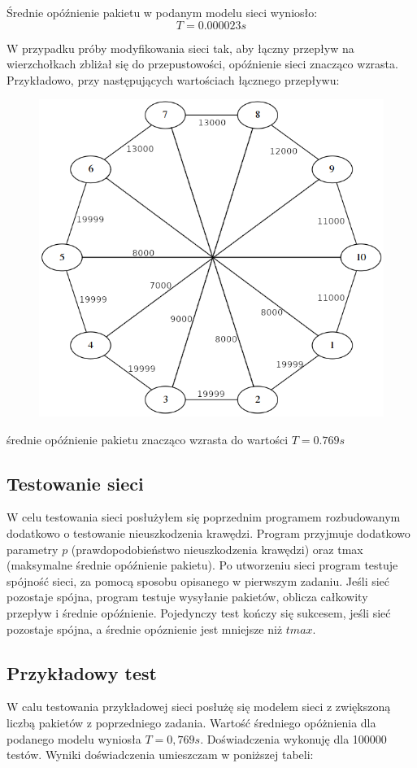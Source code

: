 \documentclass[titlepage]{article}
\begin{document}
Średnie opóźnienie pakietu w podanym modelu sieci wyniosło:
\begin{equation*}
	T = 0.000023 s
\end{equation*}

\newpage
W przypadku próby modyfikowania sieci tak, aby łączny przepływ na wierzchołkach zbliżał się do przepustowości, opóźnienie sieci znacząco wzrasta. Przykładowo, przy następujących wartościach łącznego przepływu:

\begin{figure}[h!]
	\centering
	\includegraphics[width=0.8\linewidth]{graph7.png}
\end{figure}

średnie opóźnienie pakietu znacząco wzrasta do wartości $T = 0.769 s$

\subsection{Testowanie sieci}
W celu testowania sieci posłużyłem się poprzednim programem rozbudowanym dodatkowo o testowanie nieuszkodzenia krawędzi. Program przyjmuje dodatkowo parametry $p$ (prawdopodobieństwo nieuszkodzenia krawędzi) oraz tmax (maksymalne średnie opóźnienie pakietu). Po utworzeniu sieci program testuje spójność sieci, za pomocą sposobu opisanego w pierwszym zadaniu. Jeśli sieć pozostaje spójna, program testuje wysyłanie pakietów, oblicza całkowity przepływ i średnie opóźnienie. Pojedynczy test kończy się sukcesem, jeśli sieć pozostaje spójna, a średnie opóznienie jest mniejsze niż $tmax$.

\newpage
\subsection{Przykładowy test}
W calu testowania przykładowej sieci posłużę się modelem sieci z zwiększoną liczbą pakietów z poprzedniego zadania. Wartość średniego opóżnienia dla podanego modelu wyniosła $T = 0,769 s$. Doświadczenia wykonuję dla 100000 testów. Wyniki doświadczenia umieszczam w poniższej tabeli:
\end{document}
